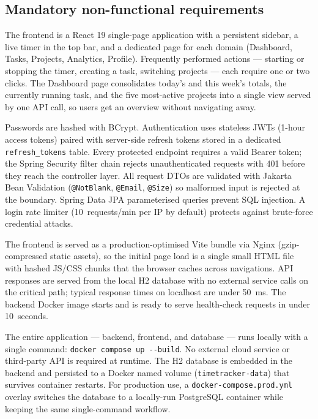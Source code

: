 \documentclass[a4paper, 12pt]{article}
\begin{document}
\subsection{Mandatory non-functional requirements}

\begin{description}[leftmargin=0pt]

  \item[Usability.]
    The frontend is a React 19 single-page application with a persistent sidebar, a live
    timer in the top bar, and a dedicated page for each domain (Dashboard, Tasks, Projects,
    Analytics, Profile). Frequently performed actions --- starting or stopping the timer,
    creating a task, switching projects --- each require one or two clicks. The Dashboard page
    consolidates today's and this week's totals, the currently running task, and the five
    most-active projects into a single view served by one API call, so users get an overview
    without navigating away.

  \item[Security.]
    Passwords are hashed with BCrypt. Authentication uses stateless JWTs (1-hour access
    tokens) paired with server-side refresh tokens stored in a dedicated
    \texttt{refresh\_tokens} table. Every protected endpoint requires a valid Bearer token;
    the Spring Security filter chain rejects unauthenticated requests with 401 before they
    reach the controller layer. All request DTOs are validated with Jakarta Bean Validation
    (\texttt{@NotBlank}, \texttt{@Email}, \texttt{@Size}) so malformed input is rejected at
    the boundary. Spring Data JPA parameterised queries prevent SQL injection. A login rate
    limiter (10~requests/min per IP by default) protects against brute-force credential attacks.

  \item[Performance.]
    The frontend is served as a production-optimised Vite bundle via Nginx (gzip-compressed
    static assets), so the initial page load is a single small HTML file with hashed JS/CSS
    chunks that the browser caches across navigations. API responses are served from the local
    H2 database with no external service calls on the critical path; typical response times
    on localhost are under 50~ms. The backend Docker image starts and is ready to serve
    health-check requests in under 10~seconds.

  \item[Independence.]
    The entire application --- backend, frontend, and database --- runs locally with a single
    command: \texttt{docker compose up -{}-build}. No external cloud service or third-party
    API is required at runtime. The H2 database is embedded in the backend and persisted to
    a Docker named volume (\texttt{timetracker-data}) that survives container restarts.
    For production use, a \texttt{docker-compose.prod.yml} overlay switches the database to
    a locally-run PostgreSQL container while keeping the same single-command workflow.

\end{description}
\end{document}
